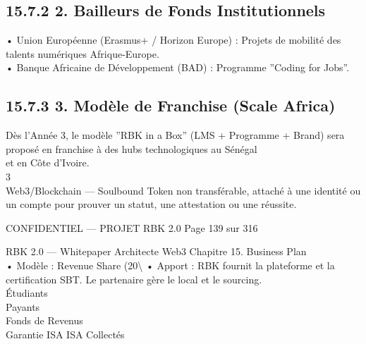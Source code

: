 \documentclass[12pt,landscape,a4paper]{article}
\newenvironment{confidential}
{\begin{tcolorbox}[
    colback=rbkred!5!white,
    colframe=rbkred!75!black,
    title=CONFIDENTIEL,
    fonttitle=\bfseries\color{white},
    coltitle=rbkred!75!black,
    breakable,
    enhanced,
    frame hidden,
    borderline west={2pt}{0pt}{rbkred!75!black}
]}
{\end{tcolorbox}}
\begin{document}
\subsection{15.7.2 2. Bailleurs de Fonds Institutionnels}
• Union Européenne (Erasmus+ / Horizon Europe) : Projets de mobilité des talents numériques Afrique-Europe.\\
\vspace{0.5em}
• Banque Africaine de Développement (BAD) : Programme ”Coding for Jobs”.\\
\vspace{0.5em}
\vspace{0.5em}
\subsection{15.7.3 3. Modèle de Franchise (Scale Africa)}
Dès l’Année 3, le modèle ”RBK in a Box” (LMS + Programme + Brand) sera proposé en franchise à des hubs technologiques au Sénégal\\
et en Côte d’Ivoire.\\
3\\
Web3/Blockchain — Soulbound Token non transférable, attaché à une identité ou un compte pour prouver un statut, une attestation ou une réussite.\\
\vspace{0.5em}
\vspace{0.5em}
\begin{confidential}CONFIDENTIEL — PROJET RBK 2.0                                           Page 139 sur 316\end{confidential}
RBK 2.0 — Whitepaper Architecte Web3                                                                           Chapitre 15. Business Plan\\
\vspace{0.5em}
\vspace{0.5em}
• Modèle : Revenue Share (20\textbackslash{}%
\vspace{0.5em}
• Apport : RBK fournit la plateforme et la certification SBT. Le partenaire gère le local et le sourcing.\\
\vspace{0.5em}
\vspace{0.5em}
Étudiants\\
Payants\\
\vspace{0.5em}
Fonds de                    Revenus\\
Garantie ISA               ISA Collectés\\
\end{document}

